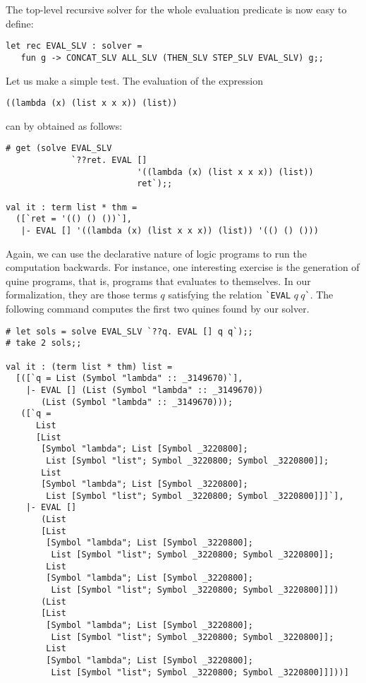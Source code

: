 The top-level recursive solver for the whole evaluation predicate is now easy to define:
\begin{verbatim}
let rec EVAL_SLV : solver =
   fun g -> CONCAT_SLV ALL_SLV (THEN_SLV STEP_SLV EVAL_SLV) g;;
\end{verbatim}

Let us make a simple test.  The evaluation of the expression
\begin{verbatim}
((lambda (x) (list x x x)) (list))
\end{verbatim}
can by obtained as follows:
\begin{verbatim}
# get (solve EVAL_SLV
             `??ret. EVAL []
                          '((lambda (x) (list x x x)) (list))
                          ret`);;

val it : term list * thm =
  ([`ret = '(() () ())`],
   |- EVAL [] '((lambda (x) (list x x x)) (list)) '(() () ()))
\end{verbatim}

Again, we can use the declarative nature of logic programs to run the
computation backwards.  For instance, one interesting exercise is the
generation of quine programs, that is, programs that evaluates to
themselves.  In our formalization, they are those terms $q$ satisfying
the relation \verb|`EVAL| $q\ q$\verb|`|.  The following command
computes the first two quines found by our solver.
\begin{verbatim}
# let sols = solve EVAL_SLV `??q. EVAL [] q q`);;
# take 2 sols;;

val it : (term list * thm) list =
  [([`q = List (Symbol "lambda" :: _3149670)`],
    |- EVAL [] (List (Symbol "lambda" :: _3149670))
       (List (Symbol "lambda" :: _3149670)));
   ([`q =
      List
      [List
       [Symbol "lambda"; List [Symbol _3220800];
        List [Symbol "list"; Symbol _3220800; Symbol _3220800]];
       List
       [Symbol "lambda"; List [Symbol _3220800];
        List [Symbol "list"; Symbol _3220800; Symbol _3220800]]]`],
    |- EVAL []
       (List
       [List
        [Symbol "lambda"; List [Symbol _3220800];
         List [Symbol "list"; Symbol _3220800; Symbol _3220800]];
        List
        [Symbol "lambda"; List [Symbol _3220800];
         List [Symbol "list"; Symbol _3220800; Symbol _3220800]]])
       (List
       [List
        [Symbol "lambda"; List [Symbol _3220800];
         List [Symbol "list"; Symbol _3220800; Symbol _3220800]];
        List
        [Symbol "lambda"; List [Symbol _3220800];
         List [Symbol "list"; Symbol _3220800; Symbol _3220800]]]))]
\end{verbatim}


